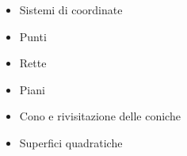 \documentclass[letterpaper,10pt,italian]{jupyterBook}
\begin{document}
\sphinxAtStartPar
{}
\begin{itemize}
\item {} 
\sphinxAtStartPar
Sistemi di coordinate

\item {} 
\sphinxAtStartPar
Punti

\item {} 
\sphinxAtStartPar
Rette

\item {} 
\sphinxAtStartPar
Piani

\item {} 
\sphinxAtStartPar
Cono e rivisitazione delle coniche

\item {} 
\sphinxAtStartPar
Superfici quadratiche

\end{itemize}



\sphinxstepscope
\end{document}
